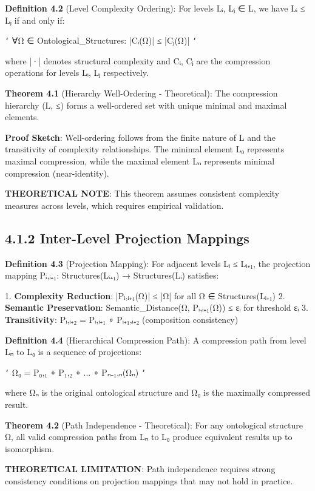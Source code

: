 \textbf{Definition 4.2} (Level Complexity Ordering): For levels Lᵢ, Lⱼ ∈ L, we have Lᵢ ≤ Lⱼ if and only if:

\texttt{`}
∀Ω ∈ Ontological_Structures: |Cᵢ(Ω)| ≤ |Cⱼ(Ω)|
\texttt{`}

where |·| denotes structural complexity and Cᵢ, Cⱼ are the compression operations for levels Lᵢ, Lⱼ respectively.

\textbf{Theorem 4.1} (Hierarchy Well-Ordering - Theoretical): The compression hierarchy (L, ≤) forms a well-ordered set with unique minimal and maximal elements.

\textbf{Proof Sketch}: Well-ordering follows from the finite nature of L and the transitivity of complexity relationships. The minimal element L₀ represents maximal compression, while the maximal element Lₙ represents minimal compression (near-identity).

\textbf{THEORETICAL NOTE}: This theorem assumes consistent complexity measures across levels, which requires empirical validation.

\subsection{4.1.2 Inter-Level Projection Mappings}

\textbf{Definition 4.3} (Projection Mapping): For adjacent levels Lᵢ ≤ Lᵢ₊₁, the projection mapping Pᵢ,ᵢ₊₁: Structures(Lᵢ₊₁) → Structures(Lᵢ) satisfies:

1. \textbf{Complexity Reduction}: |Pᵢ,ᵢ₊₁(Ω)| ≤ |Ω| for all Ω ∈ Structures(Lᵢ₊₁)
2. \textbf{Semantic Preservation}: Semantic_Distance(Ω, Pᵢ,ᵢ₊₁(Ω)) ≤ εᵢ for threshold εᵢ
3. \textbf{Transitivity}: Pᵢ,ᵢ₊₂ = Pᵢ,ᵢ₊₁ ∘ Pᵢ₊₁,ᵢ₊₂ (composition consistency)

\textbf{Definition 4.4} (Hierarchical Compression Path): A compression path from level Lₙ to L₀ is a sequence of projections:

\texttt{`}
Ω₀ = P₀,₁ ∘ P₁,₂ ∘ ... ∘ Pₙ₋₁,ₙ(Ωₙ)
\texttt{`}

where Ωₙ is the original ontological structure and Ω₀ is the maximally compressed result.

\textbf{Theorem 4.2} (Path Independence - Theoretical): For any ontological structure Ω, all valid compression paths from Lₙ to L₀ produce equivalent results up to isomorphism.

\textbf{THEORETICAL LIMITATION}: Path independence requires strong consistency conditions on projection mappings that may not hold in practice.

